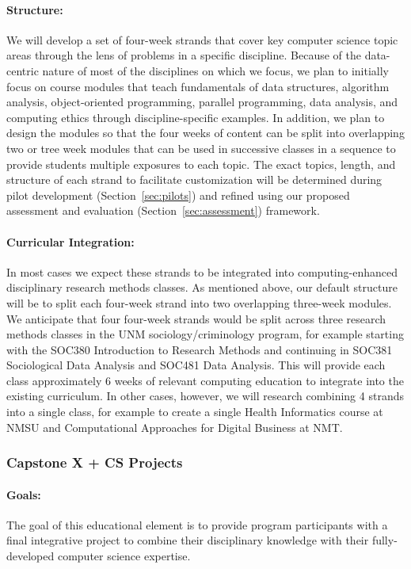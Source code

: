 \paragraph{Structure:} We will develop a set of four-week strands that cover key computer science topic areas through the lens of problems in a specific discipline. Because of the data-centric nature of most of the disciplines on which we focus, we plan to initially focus on course modules that teach fundamentals of data structures, algorithm analysis, object-oriented programming, parallel programming, data analysis, and computing ethics through discipline-specific examples. In addition, we plan to design the modules so that the four weeks of content can be split into overlapping two or tree week modules that can be used in successive classes in a sequence to provide students multiple exposures to each topic. The exact topics, length, and structure of each strand to facilitate customization will be determined during pilot development (Section~\ref{sec:pilots}) and refined using our proposed assessment and evaluation (Section~\ref{sec:assessment}) framework.

\paragraph{Curricular Integration:} In most cases we expect these strands to be integrated into computing-enhanced disciplinary research methods classes. As mentioned above, our default structure will be to split each four-week strand into two overlapping three-week modules. We anticipate that four four-week strands would be split across three research methods classes in the UNM sociology/criminology program, for example starting with the SOC380 Introduction to Research Methods and continuing in SOC381 Sociological Data Analysis
 and SOC481 Data Analysis. This will provide each class approximately 6 weeks of relevant computing education to integrate into the existing curriculum. In other cases, however, we will research combining 4 strands into a single class, for example to create a single Health Informatics course at NMSU and Computational Approaches for Digital Business at NMT. 

\subsubsection{Capstone X + CS Projects}

\paragraph{Goals:} The goal of this educational element is to provide program participants with a final integrative project to combine their disciplinary knowledge with their fully-developed computer science expertise. 

